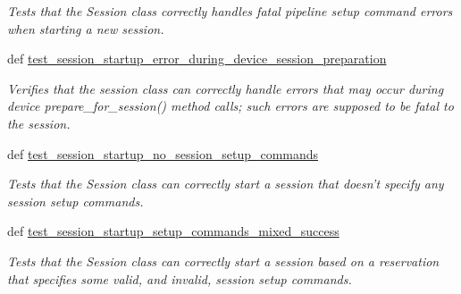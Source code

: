\begin{DoxyCompactItemize}
\begin{DoxyCompactList}\small\item\em Tests that the Session class correctly handles fatal pipeline setup command errors when starting a new session. \end{DoxyCompactList}\item 
\hypertarget{classhwm_1_1sessions_1_1tests_1_1test__session_1_1_test_session_ab10bfae11e99cd6f98cc526a8f5d554f}{def \hyperlink{classhwm_1_1sessions_1_1tests_1_1test__session_1_1_test_session_ab10bfae11e99cd6f98cc526a8f5d554f}{test\-\_\-session\-\_\-startup\-\_\-error\-\_\-during\-\_\-device\-\_\-session\-\_\-preparation}}\label{classhwm_1_1sessions_1_1tests_1_1test__session_1_1_test_session_ab10bfae11e99cd6f98cc526a8f5d554f}

\begin{DoxyCompactList}\small\item\em Verifies that the session class can correctly handle errors that may occur during device prepare\-\_\-for\-\_\-session() method calls; such errors are supposed to be fatal to the session. \end{DoxyCompactList}\item 
\hypertarget{classhwm_1_1sessions_1_1tests_1_1test__session_1_1_test_session_a7322caa254e3e238c5d04759004740ca}{def \hyperlink{classhwm_1_1sessions_1_1tests_1_1test__session_1_1_test_session_a7322caa254e3e238c5d04759004740ca}{test\-\_\-session\-\_\-startup\-\_\-no\-\_\-session\-\_\-setup\-\_\-commands}}\label{classhwm_1_1sessions_1_1tests_1_1test__session_1_1_test_session_a7322caa254e3e238c5d04759004740ca}

\begin{DoxyCompactList}\small\item\em Tests that the Session class can correctly start a session that doesn't specify any session setup commands. \end{DoxyCompactList}\item 
def \hyperlink{classhwm_1_1sessions_1_1tests_1_1test__session_1_1_test_session_a14325bd8a3bb38a88fac3daffdc5c345}{test\-\_\-session\-\_\-startup\-\_\-setup\-\_\-commands\-\_\-mixed\-\_\-success}
\begin{DoxyCompactList}\small\item\em Tests that the Session class can correctly start a session based on a reservation that specifies some valid, and invalid, session setup commands. \end{DoxyCompactList}\end{DoxyCompactItemize}
